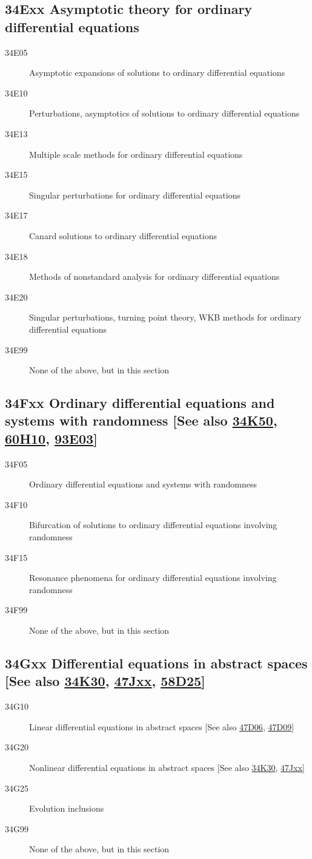 \documentclass[letterpaper]{article}
\begin{document}
\subsection*{34Exx  Asymptotic theory for ordinary differential equations }\label{34Exx}
\begin{description}  
\item [34E05]\label{34E05} Asymptotic expansions of solutions to ordinary differential equations
\item [34E10]\label{34E10} Perturbations, asymptotics of solutions to ordinary differential equations
\item [34E13]\label{34E13} Multiple scale methods for ordinary differential equations
\item [34E15]\label{34E15} Singular perturbations for ordinary differential equations
\item [34E17]\label{34E17} Canard solutions to ordinary differential equations
\item [34E18]\label{34E18} Methods of nonstandard analysis for ordinary differential equations
\item [34E20]\label{34E20} Singular perturbations, turning point theory, WKB methods for ordinary differential equations
\item [34E99]\label{34E99} None of the above, but in this section
\end{description}
\subsection*{34Fxx  Ordinary differential equations and systems with randomness [See also \hyperref[34K50]{34K50}, \hyperref[60H10]{60H10}, \hyperref[93E03]{93E03}]}\label{34Fxx}
\begin{description}  
\item [34F05]\label{34F05} Ordinary differential equations and systems with randomness
\item [34F10]\label{34F10} Bifurcation of solutions to ordinary differential equations involving randomness
\item [34F15]\label{34F15} Resonance phenomena for ordinary differential equations involving randomness
\item [34F99]\label{34F99} None of the above, but in this section
\end{description}
\subsection*{34Gxx  Differential equations in abstract spaces [See also \hyperref[34K30]{34K30}, \hyperref[47Jxx]{47Jxx}, \hyperref[58D25]{58D25}] }\label{34Gxx}
\begin{description}  
\item [34G10]\label{34G10} Linear differential equations in abstract spaces [See also \hyperref[47D06]{47D06}, \hyperref[47D09]{47D09}]
\item [34G20]\label{34G20} Nonlinear differential equations in abstract spaces [See also \hyperref[34K30]{34K30}, \hyperref[47Jxx]{47Jxx}]
\item [34G25]\label{34G25} Evolution inclusions
\item [34G99]\label{34G99} None of the above, but in this section
\end{description}
\end{document}
